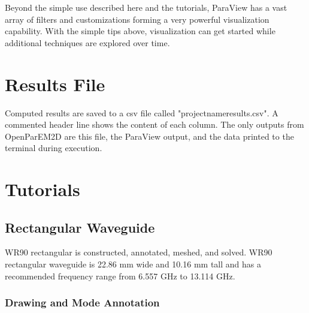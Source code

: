 \documentclass[titlepage]{article}
\renewcommand\_{\textunderscore\linebreak[1]}
\begin{document}
Beyond the simple use described here and the tutorials, ParaView has a vast array of filters and customizations forming a very powerful visualization capability. With the simple tips above, visualization can get started while additional techniques are explored over time.

\section{Results File}

Computed results are saved to a csv file called "project\_name\_results.csv".  A commented header line shows the content of each column.  The only outputs from OpenParEM2D are this file, the ParaView output, and the data printed to the terminal during execution.

\section{Tutorials}

\subsection{Rectangular Waveguide}
WR90 rectangular is constructed, annotated, meshed, and solved.  WR90 rectangular waveguide is 22.86 mm wide and 10.16 mm tall and has a recommended frequency range from 6.557 GHz to 13.114 GHz.

\subsubsection{Drawing and Mode Annotation}
\end{document}
